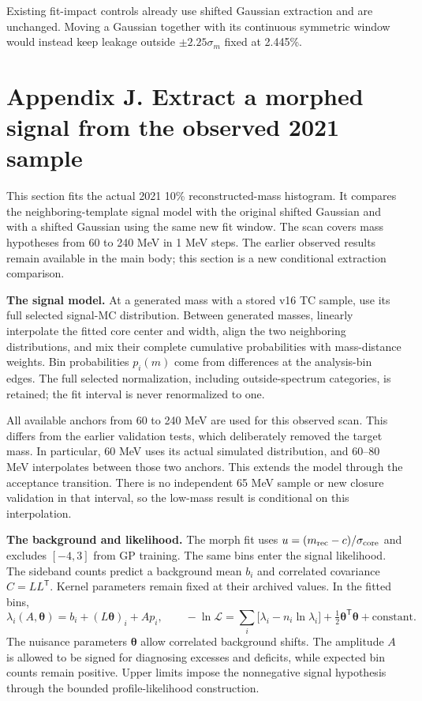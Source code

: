 \documentclass[11pt]{article}
\begin{document}
Existing fit-impact controls already use shifted Gaussian extraction and are unchanged. Moving a Gaussian together with its continuous symmetric window would instead keep leakage outside $\pm2.25\sigma_m$ fixed at 2.445\%.
\clearpage\section*{Appendix J. Extract a morphed signal from the observed 2021 sample}

This section fits the actual 2021 10\% reconstructed-mass histogram. It compares the neighboring-template signal model with the original shifted Gaussian and with a shifted Gaussian using the same new fit window. The scan covers mass hypotheses from 60 to 240 MeV in 1 MeV steps. The earlier observed results remain available in the main body; this section is a new conditional extraction comparison.

\textbf{The signal model.} At a generated mass with a stored v16 TC sample, use its full selected signal-MC distribution. Between generated masses, linearly interpolate the fitted core center and width, align the two neighboring distributions, and mix their complete cumulative probabilities with mass-distance weights. Bin probabilities $p_i(m)$ come from differences at the analysis-bin edges. The full selected normalization, including outside-spectrum categories, is retained; the fit interval is never renormalized to one.

All available anchors from 60 to 240 MeV are used for this observed scan. This differs from the earlier validation tests, which deliberately removed the target mass. In particular, 60 MeV uses its actual simulated distribution, and 60--80 MeV interpolates between those two anchors. This extends the model through the acceptance transition. There is no independent 65 MeV sample or new closure validation in that interval, so the low-mass result is conditional on this interpolation.

\textbf{The background and likelihood.} The morph fit uses $u=(m_{\rm rec}-c)/\sigma_{\rm core}$ and excludes $[-4,3]$ from GP training. The same bins enter the signal likelihood. The sideband counts predict a background mean $b_i$ and correlated covariance $C=LL^{\mathsf T}$. Kernel parameters remain fixed at their archived values. In the fitted bins,
\[
 \lambda_i(A,\boldsymbol\theta)=b_i+(L\boldsymbol\theta)_i+A p_i,
 \qquad
 -\ln\mathcal L=\sum_i\bigl[\lambda_i-n_i\ln\lambda_i\bigr]
 +\tfrac12\boldsymbol\theta^{\mathsf T}\boldsymbol\theta+\mathrm{constant}.
\]
The nuisance parameters $\boldsymbol\theta$ allow correlated background shifts. The amplitude $A$ is allowed to be signed for diagnosing excesses and deficits, while expected bin counts remain positive. Upper limits impose the nonnegative signal hypothesis through the bounded profile-likelihood construction.
\end{document}
